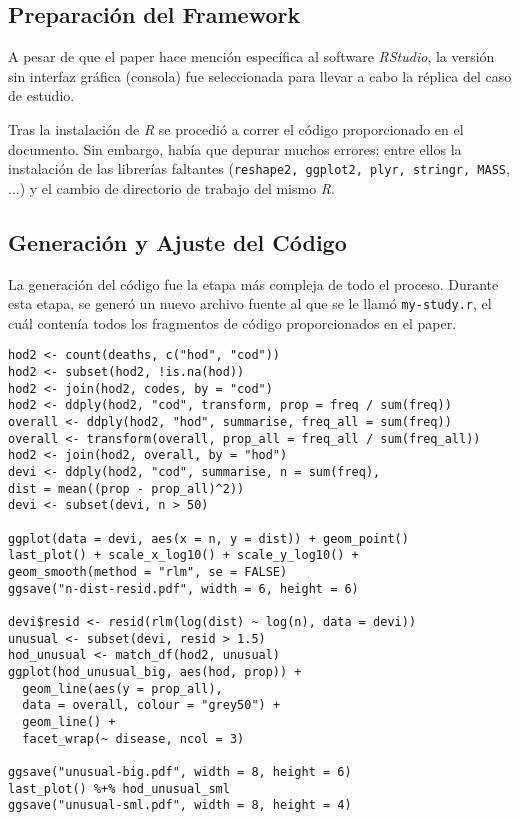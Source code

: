 \documentclass{llncs}
\begin{document}
\subsection{Preparación del Framework}
\label{subsec:frame}

A pesar de que el paper hace mención específica al software \textit{RStudio}, la versión sin interfaz gráfica (consola) fue seleccionada para llevar a cabo la réplica del caso de estudio.

Tras la instalación de \textit{R} se procedió a correr el código proporcionado en el documento.
Sin embargo, había que depurar muchos errores:
entre ellos la instalación de las librerías faltantes (\texttt{reshape2, ggplot2, plyr, stringr, MASS}, ...) y el cambio de directorio de trabajo del mismo \textit{R}.


\subsection{Generación y Ajuste del Código}
\label{subsec:code}

La generación del código fue la etapa más compleja de todo el proceso.
Durante esta etapa, se generó un nuevo archivo fuente al que se le llamó \texttt{my-study.r},
el cuál contenía todos los fragmentos de código proporcionados en el paper.

\begin{lstlisting}[label={lst:mystudy.r}, basicstyle=\scriptsize, 
caption = {Código fuente de my-study.r}]
hod2 <- count(deaths, c("hod", "cod"))
hod2 <- subset(hod2, !is.na(hod))
hod2 <- join(hod2, codes, by = "cod")
hod2 <- ddply(hod2, "cod", transform, prop = freq / sum(freq))
overall <- ddply(hod2, "hod", summarise, freq_all = sum(freq))
overall <- transform(overall, prop_all = freq_all / sum(freq_all))
hod2 <- join(hod2, overall, by = "hod")
devi <- ddply(hod2, "cod", summarise, n = sum(freq),
dist = mean((prop - prop_all)^2))
devi <- subset(devi, n > 50)

ggplot(data = devi, aes(x = n, y = dist)) + geom_point()
last_plot() + scale_x_log10() + scale_y_log10() +
geom_smooth(method = "rlm", se = FALSE)
ggsave("n-dist-resid.pdf", width = 6, height = 6)

devi$resid <- resid(rlm(log(dist) ~ log(n), data = devi))
unusual <- subset(devi, resid > 1.5)
hod_unusual <- match_df(hod2, unusual)
ggplot(hod_unusual_big, aes(hod, prop)) + 
  geom_line(aes(y = prop_all),
  data = overall, colour = "grey50") +
  geom_line() + 
  facet_wrap(~ disease, ncol = 3)

ggsave("unusual-big.pdf", width = 8, height = 6)
last_plot() %+% hod_unusual_sml
ggsave("unusual-sml.pdf", width = 8, height = 4)

\end{lstlisting}
\end{document}
